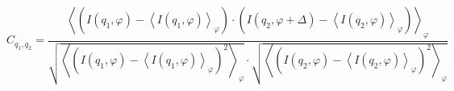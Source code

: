 \documentclass[12pt]{article}
\begin{document}
\begin{equation*}\label{xcca}
C_{q_1,q_2} = \frac{\left\langle \left(I(q_1,\varphi)-\left\langle I(q_1,\varphi)\right\rangle_{\varphi}\right)\cdot\left(I(q_2,\varphi+\Delta)-\left\langle I(q_2,\varphi)\right\rangle_{\varphi}\right)\right\rangle_{\varphi}}
{\sqrt{\left\langle \left(I(q_1,\varphi)-\left\langle I(q_1,\varphi)\right\rangle_{\varphi}\right)^2\right\rangle_{\varphi}}\cdot\sqrt{\left\langle \left(I(q_2,\varphi)-\left\langle I(q_2,\varphi)\right\rangle_{\varphi}\right)^2\right\rangle_{\varphi}}}
\end{equation*}
\end{document}
